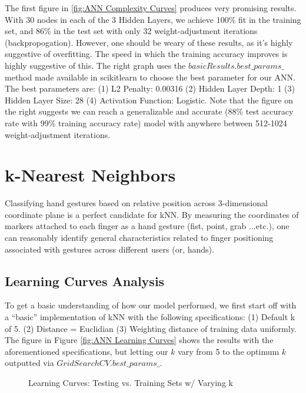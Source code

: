 \documentclass[letterpaper,12pt]{article}
\begin{document}
The first figure in \ref{fig:ANN Complexity Curves} produces very promising results.  With 30 nodes in each of the 3 Hidden Layers, we achieve 100\% fit in the training set, and 86\% in the test set with only 32 weight-adjustment iterations (backpropogation).  However, one should be weary of these results, as it's highly suggestive of overfitting.  The speed in which the training accuracy improves is highly suggestive of this.  The right graph uses the $basicResults.best\_params\_$ method made available in scikitlearn to choose the best parameter for our ANN.  The best parameters are:  (1) L2 Penalty: 0.00316 (2) Hidden Layer Depth: 1 (3) Hidden Layer Size: 28 (4) Activation Function: Logistic.  Note that the figure on the right suggests we can reach a generalizable and accurate (88\% test accuracy rate with 99\% training accuracy rate) model with anywhere between 512-1024 weight-adjustment iterations.


\section{k-Nearest Neighbors}
Classifying hand gestures based on relative position across 3-dimensional coordinate plane is a perfect candidate for kNN.  By measuring the coordinates of markers attached to each finger as a hand gesture (fist, point, grab ...etc.), one can reasonably identify general characteristics related to finger positioning associated with gestures across different users (or, hands).

\subsection{Learning Curves Analysis}
To get a basic understanding of how our model performed, we first start off with a ``basic'' implementation of kNN with the following specifications:  (1) Default k of 5.  (2) Distance = Euclidian (3) Weighting distance of training data uniformly. The figure in Figure \ref{fig:ANN Learning Curves} shows the results with the aforementioned specifications, but letting our $k$ vary from 5 to the optimum $k$ outputted via $GridSearchCV.best\_params\_$.  


\begin{figure} %
  \centering
  \hspace{8pt}%
  \caption{Learning Curves:  Testing vs. Training Sets w/ Varying k}\label{fig:kNN Learning Curves}
\end{figure}
\end{document}
